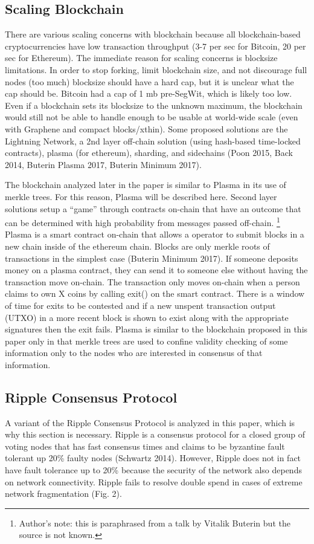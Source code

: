 \documentclass[letterpaper, 10 pt, conference]{ieeeconf}  %
\begin{document}
\subsection{Scaling Blockchain}
There are various scaling concerns with blockchain because all blockchain-based cryptocurrencies have low transaction throughput (3-7 per sec for Bitcoin, 20 per sec for Ethereum). The immediate reason for scaling concerns is blocksize limitations. In order to stop forking, limit blockchain size, and not discourage full nodes (too much) blocksize should have a hard cap, but it is unclear what the cap should be. Bitcoin had a cap of 1 mb pre-SegWit, which is likely too low. Even if a blockchain sets its blocksize to the unknown maximum, the blockchain would still not be able to handle enough to be usable at world-wide scale (even with Graphene and compact blocks/xthin). Some proposed solutions are the Lightning Network, a 2nd layer off-chain solution (using hash-based time-locked contracts), plasma (for ethereum), sharding, and sidechains (Poon 2015, Back 2014, Buterin Plasma 2017, Buterin Minimum 2017). 

The blockchain analyzed later in the paper is similar to Plasma in its use of merkle trees. For this reason, Plasma will be described here. Second layer solutions setup a “game” through contracts on-chain that have an outcome that can be determined with high probability from messages passed off-chain. \footnote{Author's note: this is paraphrased from a talk by Vitalik Buterin but the source is not known.} Plasma is a smart contract on-chain that allows a operator to submit blocks in a new chain inside of the ethereum chain. Blocks are only merkle roots of transactions in the simplest case (Buterin Minimum 2017). If someone deposits money on a plasma contract, they can send it to someone else without having the transaction move on-chain. The transaction only moves on-chain when a person claims to own X coins by calling exit() on the smart contract. There is a window of time for exits to be contested and if a new unspent transaction output (UTXO) in a more recent block is shown to exist along with the appropriate signatures then the exit fails. Plasma is similar to the blockchain proposed in this paper only in that merkle trees are used to confine validity checking of some information only to the nodes who are interested in consensus of that information. 

\subsection{Ripple Consensus Protocol}
A variant of the Ripple Consensus Protocol is analyzed in this paper, which is why this section is necessary. Ripple is a consensus protocol for a closed group of voting nodes that has fast consensus times and claims to be byzantine fault tolerant up 20\% faulty nodes (Schwartz 2014). However, Ripple does not in fact have fault tolerance up to 20\% because the security of the network also depends on network connectivity. Ripple fails to resolve double spend in cases of extreme network fragmentation (Fig. 2).
\end{document}
